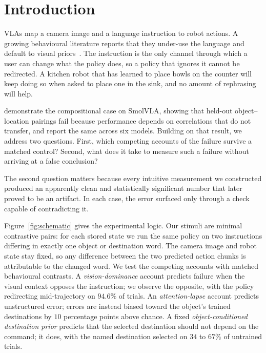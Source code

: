 \documentclass{article}
\begin{document}
\section{Introduction}
\label{sec:intro}

VLAs map a camera image and a language instruction to robot actions. A growing behavioural
literature reports that they under-use the language and default to visual
priors~\citep{better,icbench,liberocf,robosem}. The instruction is the only channel through
which a user can change what the policy does, so a policy that ignores it cannot be redirected.
A kitchen robot that has learned to place bowls on the counter will keep doing so when asked to
place one in the sink, and no amount of rephrasing will help.

\citet{brittle} demonstrate the compositional case on SmolVLA, showing that held-out
object--location pairings fail because performance depends on correlations that do not
transfer, and \citet{scaleup} report the same across six models. Building on that result, we
address two questions. First, which competing accounts of the failure survive a matched
control? Second, what does it take to measure such a failure without arriving at a false
conclusion?

The second question matters because every intuitive measurement we constructed produced an
apparently clean and statistically significant number that later proved to be an artifact. In
each case, the error surfaced only through a check capable of contradicting it.

Figure~\ref{fig:schematic} gives the experimental logic. Our stimuli are minimal contrastive
pairs: for each stored state we run the same policy on two instructions differing in exactly one
object or destination word. The camera image and robot state stay fixed, so any difference
between the two predicted action chunks is attributable to the changed word. We test the
competing accounts with matched behavioural contrasts. A
\emph{vision-dominance} account predicts failure when the visual context opposes the
instruction; we observe the opposite, with the policy redirecting mid-trajectory on $94.6\%$ of
trials. An \emph{attention-lapse} account predicts unstructured error; errors are instead biased
toward the object's trained destinations by $10$ percentage points above chance. A fixed
\emph{object-conditioned destination prior} predicts that the selected destination should not
depend on the command; it does, with the named destination selected on $34$ to $67\%$ of
untrained trials.
\end{document}
